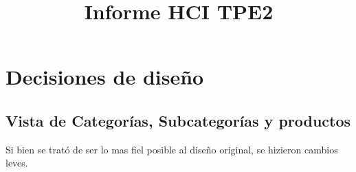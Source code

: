 \documentclass[english]{article}
\begin{document}
\title{Informe HCI TPE2}

\maketitle

\section{Decisiones de diseño}


\subsection*{Vista de Categorías, Subcategorías y productos }

Si bien se trató de ser lo mas fiel posible al diseño original, se
hizieron cambios leves.
\end{document}
